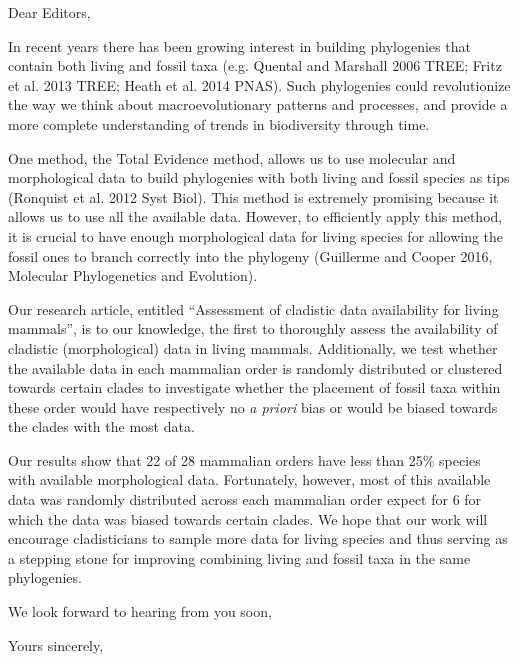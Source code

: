 \documentclass[11pt]{letter}
\begin{document}
\begin{letter}{}
\opening{Dear Editors,}

In recent years there has been growing interest in building phylogenies that contain both living and fossil taxa (e.g. Quental and Marshall 2006 TREE; Fritz et al. 2013 TREE; Heath et al. 2014 PNAS).
Such phylogenies could revolutionize the way we think about macroevolutionary patterns and processes, and provide a more complete understanding of trends in biodiversity through time.

One method, the Total Evidence method, allows us to use molecular and morphological data to build phylogenies with both living and fossil species as tips (Ronquist et al. 2012 Syst Biol).
This method is extremely promising because it allows us to use all the available data. However, to efficiently apply this method, it is crucial to have enough morphological data for living species for allowing the fossil ones to branch correctly into the phylogeny (Guillerme and Cooper 2016, Molecular Phylogenetics and Evolution).

Our research article, entitled ``Assessment of cladistic data availability for living mammals'', is to our knowledge, the first to thoroughly assess the availability of cladistic (morphological) data in living mammals.
Additionally, we test whether the available data in each mammalian order is randomly distributed or clustered towards certain clades to investigate whether the placement of fossil taxa within these order would have respectively no \textit{a priori} bias or would be biased towards the clades with the most data.

Our results show that 22 of 28 mammalian orders have less than 25\% species with available morphological data.
Fortunately, however, most of this available data was randomly distributed across each mammalian order expect for 6 for which the data was biased towards certain clades.
We hope that our work will encourage cladisticians %
to sample more data for living species and thus serving as a stepping stone for improving combining living and fossil taxa in the same phylogenies.

We look forward to hearing from you soon,


\closing{Yours sincerely,}


\end{letter}
\end{document}
